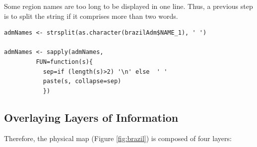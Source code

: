Some region names are too long to be displayed in one line. Thus, a
previous step is to split the string if it comprises more than two
words.


\lstset{language=R,numbers=none}
\begin{lstlisting}
admNames <- strsplit(as.character(brazilAdm$NAME_1), ' ')

admNames <- sapply(admNames,
		 FUN=function(s){
		   sep=if (length(s)>2) '\n' else  ' '
		   paste(s, collapse=sep)
		   })
\end{lstlisting}
\subsection{Overlaying Layers of Information}
\label{sec-1-4}
Therefore, the physical map (Figure \ref{fig:brazil}) is composed
of four layers: 

